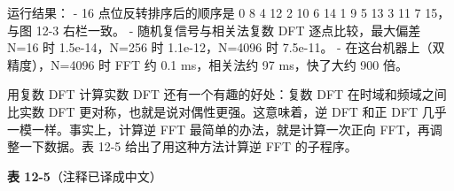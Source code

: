 \begin{Shaded}
\begin{Highlighting}[]
\OperatorTok{[}\OperatorTok{]} \OperatorTok{=}\OperatorTok{[}\OperatorTok{]} \OperatorTok{{-}}\OperatorTok{;}                  
\OperatorTok{[}\OperatorTok{]} \OperatorTok{=}\OperatorTok{[}\OperatorTok{]} \OperatorTok{{-}}\OperatorTok{;}
\OperatorTok{[}\OperatorTok{]} \OperatorTok{=}\OperatorTok{[}\OperatorTok{]} \OperatorTok{+}\OperatorTok{;}                   
\OperatorTok{[}\OperatorTok{]} \OperatorTok{=}\OperatorTok{[}\OperatorTok{]} \OperatorTok{+}\OperatorTok{;}
            \OperatorTok{\}}
            \OperatorTok{=}\OperatorTok{;}                     
\OperatorTok{=}\OperatorTok{*}\OperatorTok{{-}}\OperatorTok{*}\OperatorTok{;}
\OperatorTok{=}\OperatorTok{*}\OperatorTok{+}\OperatorTok{*}\OperatorTok{;}
        \OperatorTok{\}}
    \OperatorTok{\}}
\OperatorTok{\}}
\end{Highlighting}
\end{Shaded}

运行结果： - 16 点位反转排序后的顺序是 0 8 4 12 2 10 6 14 1 9 5 13 3 11
7 15，与图 12-3 右栏一致。 - 随机复信号与相关法复数 DFT
逐点比较，最大偏差 N=16 时 1.5e-14，N=256 时 1.1e-12，N=4096 时
7.5e-11。 - 在这台机器上（双精度），N=4096 时 FFT 约 0.1 ms，相关法约 97
ms，快了大约 900 倍。

用复数 DFT 计算实数 DFT 还有一个有趣的好处：复数 DFT
在时域和频域之间比实数 DFT 更对称，也就是说对偶性更强。这意味着，逆 DFT
和正 DFT 几乎一模一样。事实上，计算逆 FFT 最简单的办法，就是计算一次正向
FFT，再调整一下数据。表 12-5 给出了用这种方法计算逆 FFT 的子程序。

\textbf{表 12-5}（注释已译成中文）

